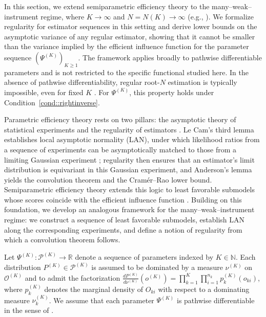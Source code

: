 \documentclass[11pt]{article}
\theoremstyle{plain}
\theoremstyle{definition}
\theoremstyle{remark}
\theoremstyle{definition}
\begin{document}
In this section, we extend semiparametric efficiency theory to the
many--weak--instrument regime, where \(K \to \infty\) and \(N = N(K) \to \infty\)
(e.g., \citealp{bickel1993efficient, van2000asymptotic}). We formalize
regularity for estimator sequences in this setting and derive lower bounds on
the asymptotic variance of any regular estimator, showing that it cannot be
smaller than the variance implied by the efficient influence function for the
parameter sequence \((\Psi^{(K)})_{K \ge 1}\). The framework applies broadly to
pathwise differentiable parameters and is not restricted to the specific
functional studied here. In the absence of pathwise differentiability, regular
root-\(N\) estimation is typically impossible, even for fixed \(K\)
\citep{van1991differentiable, van2000asymptotic, hirano2012impossibility}. For
\(\Psi^{(K)}\), this property holds under Condition~\ref{cond::rightinverse}. 


Parametric efficiency theory rests on two pillars: the asymptotic theory of
statistical experiments \citep{le1972limits} and the regularity of estimators
\citep{hajek1970characterization, van2000asymptotic}. Le Cam’s third lemma
establishes local asymptotic normality (LAN), under which likelihood ratios from
a sequence of experiments can be asymptotically matched to those from a limiting
Gaussian experiment \citep{cam1960locally, le2012asymptotic}; regularity then
ensures that an estimator’s limit distribution is equivariant in this Gaussian
experiment, and Anderson’s lemma yields the convolution theorem and the
Cramér--Rao lower bound. Semiparametric efficiency theory extends this logic to
least favorable submodels whose scores coincide with the efficient influence
function \citep{stein1956efficient, bickel1993efficient}. Building on this
foundation, we develop an analogous framework for the many--weak--instrument
regime: we construct a sequence of least favorable submodels, establish LAN
along the corresponding experiments, and define a notion of regularity from
which a convolution theorem follows.


Let \(\Psi^{(K)}: \mathcal{P}^{(K)} \to \mathbb{R}\) denote a sequence of parameters indexed by \(K \in \mathbb{N}\).  
Each distribution \(P^{(K)} \in \mathcal{P}^{(K)}\) is assumed to be dominated by a measure \(\nu^{(K)}\) on \(\mathcal{O}^{(K)}\) and to admit the factorization  
\(\tfrac{dP^{(K)}}{d\nu^{(K)}}(o^{(K)}) = \prod_{k=1}^K \prod_{i=1}^{n_k} p_k^{(K)}(o_{ki})\),  
where \(p_k^{(K)}\) denotes the marginal density of \(O_{ki}\) with respect to a dominating measure \(\nu_k^{(K)}\).  We assume that each parameter \(\Psi^{(K)}\) is pathwise differentiable in the sense of \citet{bickel1993efficient}.
\end{document}
